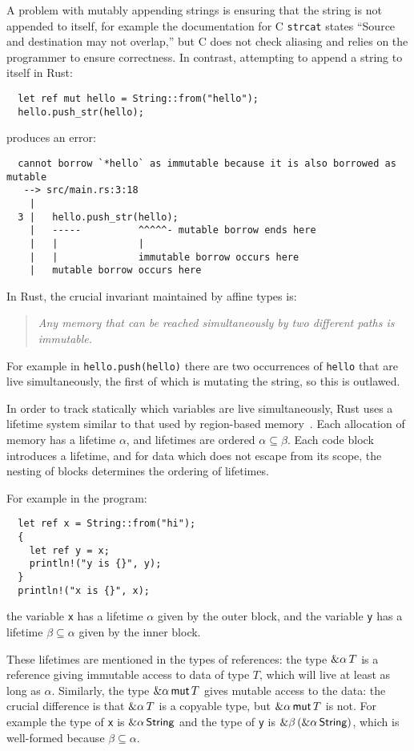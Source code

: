 A problem with mutably appending strings is ensuring that the string
is not appended to itself, for example the documentation for
C \verb|strcat| states ``Source and destination may not
overlap,'' but C does not check aliasing and relies on the programmer
to ensure correctness. In contrast, attempting to append a string
to itself in Rust:
\begin{verbatim}
  let ref mut hello = String::from("hello");
  hello.push_str(hello);
\end{verbatim}
produces an error:
\begin{verbatim}
  cannot borrow `*hello` as immutable because it is also borrowed as mutable
   --> src/main.rs:3:18
    |
  3 |   hello.push_str(hello);
    |   -----          ^^^^^- mutable borrow ends here
    |   |              |
    |   |              immutable borrow occurs here
    |   mutable borrow occurs here
\end{verbatim}
In Rust, the crucial invariant maintained by affine types is:
\begin{quote}\em
  Any memory that can be reached simultaneously by two different paths
  is immutable.
\end{quote}
For example in \verb|hello.push(hello)| there are two occurrences of \verb|hello| that
are live simultaneously, the first of which is mutating the string, so this is outlawed.

In order to track statically which variables are live simultaneously, Rust uses a lifetime
system similar to that used by region-based memory~\cite{regions}. Each allocation of
memory has a lifetime $\alpha$, and lifetimes are ordered $\alpha\subseteq\beta$.
Each code block introduces a lifetime, and for data which does not escape from its scope,
the nesting of blocks determines the ordering of lifetimes.

For example in the program:
\begin{verbatim}
  let ref x = String::from("hi");
  {
    let ref y = x;
    println!("y is {}", y);
  }
  println!("x is {}", x);
\end{verbatim}
the variable \verb|x| has a lifetime $\alpha$ given by the outer block,
and the variable \verb|y| has a lifetime $\beta\subseteq\alpha$ given by the inner block.

These lifetimes are mentioned in the types of references: the type $\&\alpha\, T$
is a reference giving immutable access to data of type $T$, which will live at least as long as
$\alpha$. Similarly, the type $\&\alpha\,\mathsf{mut}\, T$ gives mutable access to the data: the crucial
difference is that $\&\alpha\, T$ is a copyable type, but $\&\alpha\,\mathsf{mut}\, T$ is not.
For example
the type of \verb|x| is $\&\alpha\,\mathsf{String}$ and the type of \verb|y| is
$\&\beta\,(\&\alpha\,\mathsf{String})$, which is well-formed because $\beta\subseteq\alpha$.

